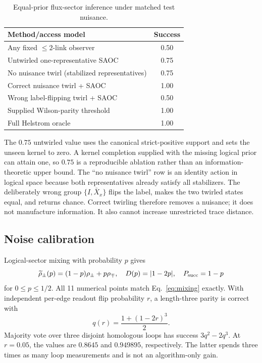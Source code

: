 \documentclass[letterpaper,journal]{IEEEtran}
\newcommand{\SAOC}{\textsc{SAOC}}
\begin{document}
\begin{table}[t]
\centering
\caption{Equal-prior flux-sector inference under matched test nuisance.}
\label{tab:success}
\begin{tabular}{lc}
\toprule
Method/access model & Success\\
\midrule
Any fixed $\leq2$-link observer & 0.50\\
Untwirled one-representative \SAOC & 0.75\\
No nuisance twirl (stabilized representatives) & 0.75\\
Correct nuisance twirl + \SAOC & 1.00\\
Wrong label-flipping twirl + \SAOC & 0.50\\
Supplied Wilson-parity threshold & 1.00\\
Full Helstrom oracle & 1.00\\
\bottomrule
\end{tabular}
\end{table}

The $0.75$ untwirled value uses the canonical strict-positive support and sets
the unseen kernel to zero. A kernel completion supplied with the missing
logical prior can attain one, so $0.75$ is a reproducible ablation rather than
an information-theoretic upper bound. The ``no nuisance twirl'' row is an
identity action in logical space because both representatives already satisfy
all stabilizers. The deliberately wrong group $\{I,\bar X_x\}$ flips the
label, makes the two twirled states equal, and returns chance. Correct twirling
therefore removes a nuisance; it does not manufacture information. It also
cannot increase unrestricted trace distance.

\subsection{Noise calibration}

Logical-sector mixing with probability $p$ gives
\begin{equation}
\widetilde\rho_\pm(p)=(1-p)\rho_\pm+p\rho_\mp,\quad
D(p)=|1-2p|,\quad P_{\rm succ}=1-p
\label{eq:mixing}
\end{equation}
for $0\leq p\leq1/2$. All 11 numerical points match
Eq.~\eqref{eq:mixing} exactly. With independent per-edge readout flip
probability $r$, a length-three parity is correct with
\begin{equation}
q(r)=\frac{1+(1-2r)^3}{2}.
\label{eq:readout}
\end{equation}
Majority vote over three disjoint homologous loops has success
$3q^2-2q^3$. At $r=0.05$, the values are $0.8645$ and $0.949895$,
respectively. The latter spends three times as many loop measurements and is
not an algorithm-only gain.
\end{document}

